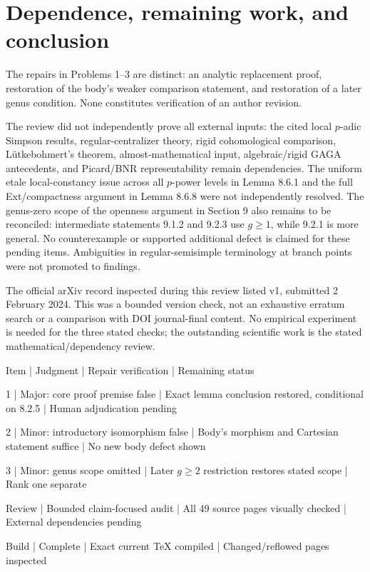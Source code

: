 \documentclass[10pt]{article}
\begin{document}
\section*{Dependence, remaining work, and conclusion}
The repairs in Problems 1–3 are distinct: an analytic replacement proof, restoration of the body’s weaker comparison statement, and restoration of a later genus condition. None constitutes verification of an author revision.\par
The review did not independently prove all external inputs: the cited local \(p\)-adic Simpson results, regular-centralizer theory, rigid cohomological comparison, Lütkebohmert’s theorem, almost-mathematical input, algebraic/rigid GAGA antecedents, and Picard/BNR representability remain dependencies. The uniform etale local-constancy issue across all \(p\)-power levels in Lemma 8.6.1 and the full Ext/compactness argument in Lemma 8.6.8 were not independently resolved. The genus-zero scope of the openness argument in Section 9 also remains to be reconciled: intermediate statements 9.1.2 and 9.2.3 use \(g\geq1\), while 9.2.1 is more general. No counterexample or supported additional defect is claimed for these pending items. Ambiguities in regular-semisimple terminology at branch points were not promoted to findings.\par
The official arXiv record inspected during this review listed v1, submitted 2 February 2024. This was a bounded version check, not an exhaustive erratum search or a comparison with DOI journal-final content. No empirical experiment is needed for the three stated checks; the outstanding scientific work is the stated mathematical/dependency review.\par
Item | Judgment | Repair verification | Remaining status\par
1 | Major: core proof premise false | Exact lemma conclusion restored, conditional on 8.2.5 | Human adjudication pending\par
2 | Minor: introductory isomorphism false | Body’s morphism and Cartesian statement suffice | No new body defect shown\par
3 | Minor: genus scope omitted | Later \(g\geq2\) restriction restores stated scope | Rank one separate\par
Review | Bounded claim-focused audit | All 49 source pages visually checked | External dependencies pending\par
Build | Complete | Exact current TeX compiled | Changed/reflowed pages inspected\par
\end{document}
